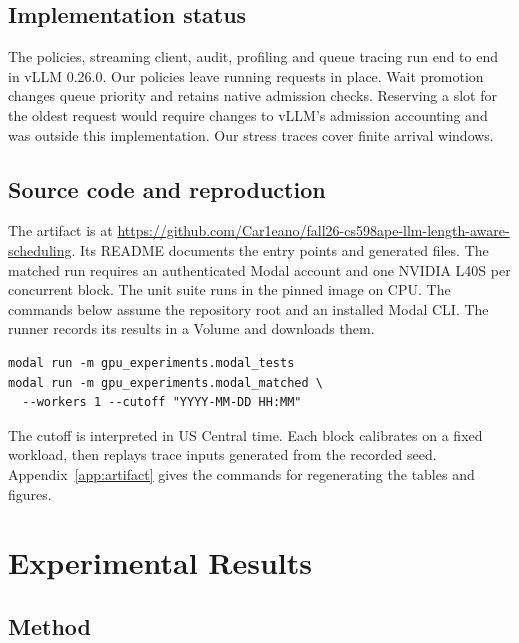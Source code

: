 \documentclass[sigplan,nonacm]{acmart}
\begin{document}
\subsection{Implementation status}
The policies, streaming client, audit, profiling and queue tracing run
end to end in vLLM 0.26.0. Our policies leave running requests in place.
Wait promotion changes queue priority and retains native admission
checks. Reserving a slot for the oldest request would require changes to
vLLM's admission accounting and was outside this implementation.
Our stress traces cover finite arrival windows.

\subsection{Source code and reproduction}
The artifact is at
\url{https://github.com/Car1eano/fall26-cs598ape-llm-length-aware-scheduling}.
Its README documents the entry points and generated files.
The matched run requires an authenticated Modal account and one NVIDIA
L40S per concurrent block. The unit suite runs in the pinned image on
CPU. The commands below assume the repository root and an installed
Modal CLI. The runner records its results in a Volume and downloads them.
\begin{lstlisting}
modal run -m gpu_experiments.modal_tests
modal run -m gpu_experiments.modal_matched \
  --workers 1 --cutoff "YYYY-MM-DD HH:MM"
\end{lstlisting}
The cutoff is interpreted in US Central time. Each block calibrates on a
fixed workload, then replays trace inputs generated from the recorded
seed. Appendix~\ref{app:artifact} gives the commands for regenerating
the tables and figures.


\section{Experimental Results}

\subsection{Method}
\end{document}
